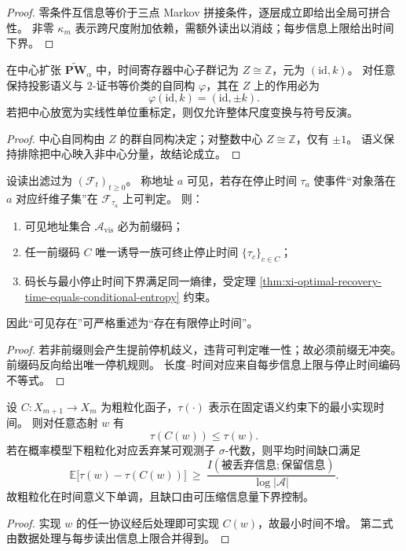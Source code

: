 \begin{proof}
零条件互信息等价于三点 Markov 拼接条件，逐层成立即给出全局可拼合性。
非零 \(\kappa_m\) 表示跨尺度附加依赖，需额外读出以消歧；每步信息上限给出时间下界。
\end{proof}

\begin{theorem}\label{thm:xi-time-center-semantic-rigidity}
在中心扩张 \(\widetilde{\mathbf{PW}}_{\alpha}\) 中，时间寄存器中心子群记为
\(
Z\cong\mathbb Z
\)，元为 \((\mathrm{id},k)\)。
对任意保持投影语义与 \(2\)-证书等价类的自同构 \(\varphi\)，其在 \(Z\) 上的作用必为
\[
\varphi(\mathrm{id},k)=(\mathrm{id},\pm k).
\]
若把中心放宽为实线性单位重标定，则仅允许整体尺度变换与符号反演。
\end{theorem}

\begin{proof}
中心自同构由 \(Z\) 的群自同构决定；对整数中心 \(Z\cong\mathbb Z\)，仅有 \(\pm1\)。
语义保持排除把中心映入非中心分量，故结论成立。
\end{proof}

\begin{theorem}\label{thm:xi-address-stopping-time-equivalence}
设读出滤过为 \((\mathcal F_t)_{t\ge 0}\)。
称地址 \(a\) 可见，若存在停止时间 \(\tau_a\) 使事件“对象落在 \(a\) 对应纤维子集”在 \(\mathcal F_{\tau_a}\) 上可判定。
则：
\begin{enumerate}
  \item 可见地址集合 \(\mathcal A_{\mathrm{vis}}\) 必为前缀码；
  \item 任一前缀码 \(C\) 唯一诱导一族可终止停止时间 \(\{\tau_c\}_{c\in C}\)；
  \item 码长与最小停止时间下界满足同一熵律，受定理 \ref{thm:xi-optimal-recovery-time-equals-conditional-entropy} 约束。
\end{enumerate}
因此“可见存在”可严格重述为“存在有限停止时间”。
\end{theorem}

\begin{proof}
若非前缀则会产生提前停机歧义，违背可判定唯一性；故必须前缀无冲突。
前缀码反向给出唯一停机规则。
长度--时间对应来自每步信息上限与停止时间编码不等式。
\end{proof}

\begin{theorem}\label{thm:xi-time-monotone-under-coarse-graining}
设 \(C:X_{m+1}\to X_m\) 为粗粒化函子，\(\tau(\cdot)\) 表示在固定语义约束下的最小实现时间。
则对任意态射 \(w\) 有
\[
\tau(C(w))\le \tau(w).
\]
若在概率模型下粗粒化对应丢弃某可观测子 \(\sigma\)-代数，则平均时间缺口满足
\[
\mathbb E\!\bigl[\tau(w)-\tau(C(w))\bigr]
\ \ge\
\frac{I(\text{被丢弃信息};\text{保留信息})}{\log|\mathcal A|}.
\]
故粗粒化在时间意义下单调，且缺口由可压缩信息量下界控制。
\end{theorem}

\begin{proof}
实现 \(w\) 的任一协议经后处理即可实现 \(C(w)\)，故最小时间不增。
第二式由数据处理与每步读出信息上限合并得到。
\end{proof}
